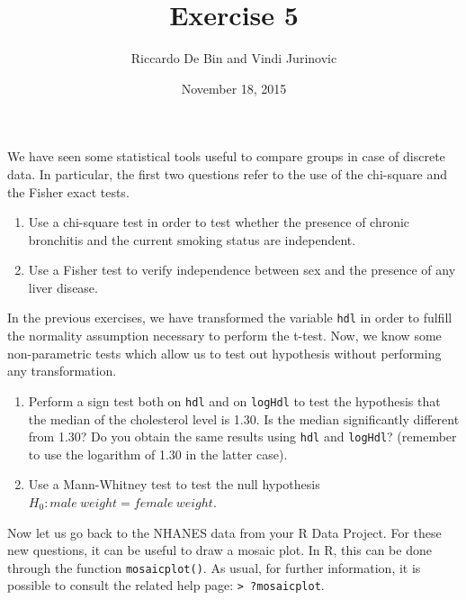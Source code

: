 \documentclass[]{article}
\title{Exercise 5}
\author{Riccardo De Bin and Vindi Jurinovic}
\date{November 18, 2015}
\begin{document}
\maketitle


We have seen some statistical tools useful to compare groups in case of
discrete data. In particular, the first two questions refer to the use
of the chi-square and the Fisher exact tests.

\begin{enumerate}
\def\labelenumi{\arabic{enumi}.}
\itemsep1pt\parskip0pt
\item
  Use a chi-square test in order to test whether the presence of chronic
  bronchitis and the current smoking status are independent.\\
\item
  Use a Fisher test to verify independence between sex and the presence
  of any liver disease.
\end{enumerate}

In the previous exercises, we have transformed the variable \texttt{hdl}
in order to fulfill the normality assumption necessary to perform the
t-test. Now, we know some non-parametric tests which allow us to test
out hypothesis without performing any transformation.

\begin{enumerate}
\def\labelenumi{\arabic{enumi}.}
\setcounter{enumi}{2}
\itemsep1pt\parskip0pt
\item
  Perform a sign test both on \texttt{hdl} and on \texttt{logHdl} to
  test the hypothesis that the median of the cholesterol level is 1.30.
  Is the median significantly different from 1.30? Do you obtain the
  same results using \texttt{hdl} and \texttt{logHdl}? (remember to use
  the logarithm of 1.30 in the latter case).\\
\item
  Use a Mann-Whitney test to test the null hypothesis
  $H_0 : male\:weight = female\:weight$.
\end{enumerate}

Now let us go back to the NHANES data from your R Data Project. For
these new questions, it can be useful to draw a mosaic plot. In R, this
can be done through the function \texttt{mosaicplot()}. As usual, for
further information, it is possible to consult the related help page:
\texttt{\textgreater{} ?mosaicplot}.
\end{document}
